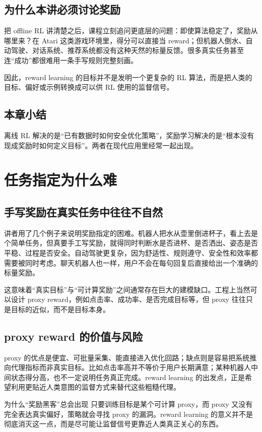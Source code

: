 \documentclass[a4paper]{article}
\begin{document}
\subsection{为什么本讲必须讨论奖励}
把 offline RL 讲清楚之后，课程立刻追问更底层的问题：即使算法稳定了，奖励从哪里来？在 Atari 这类游戏环境里，得分可以直接当 reward；但机器人倒水、自动驾驶、对话系统、推荐系统都没有这种天然的标量反馈。很多真实任务甚至连“成功”都很难用一条手写规则完整刻画。

因此，reward learning 的目标并不是发明一个更复杂的 RL 算法，而是把人类的目标、偏好或示例转换成可以供 RL 使用的监督信号。

\subsection{本章小结}
离线 RL 解决的是“已有数据时如何安全优化策略”，奖励学习解决的是“根本没有现成奖励时如何定义目标”。两者在现代应用里经常一起出现。

\section{任务指定为什么难}

\subsection{手写奖励在真实任务中往往不自然}
讲者用了几个例子来说明奖励指定的困难。机器人把水从壶里倒进杯子，看上去是个简单任务，但真要手工写奖励，就得同时判断水是否进杯、是否洒出、姿态是否平稳、过程是否安全。自动驾驶更复杂，因为舒适性、规则遵守、安全性和效率都需要被同时考虑。聊天机器人也一样，用户不会在每句回复后直接给出一个准确的标量奖励。

这意味着“真实目标”与“可计算奖励”之间通常存在巨大的建模缺口。工程上当然可以设计 proxy reward，例如点击率、成功率、是否完成目标等，但 proxy 往往只是目标的近似，而不是目标本身。

\subsection{proxy reward 的价值与风险}
proxy 的优点是便宜、可批量采集、能直接进入优化回路；缺点则是容易把系统推向代理指标而非真实目标。比如点击率高并不等价于用户长期满意；某种机器人中间状态得分高，也不一定说明任务真正完成。reward learning 的出发点，正是希望利用更贴近人类意图的监督方式来替代这些粗糙代理。

\begin{warningbox}{为什么“奖励黑客”总会出现}
只要训练目标是某个可计算 proxy，而 proxy 又没有完全表达真实偏好，策略就会寻找 proxy 的漏洞。reward learning 的意义并不是彻底消灭这一点，而是尽可能让监督信号更靠近人类真正关心的东西。
\end{warningbox}
\end{document}

